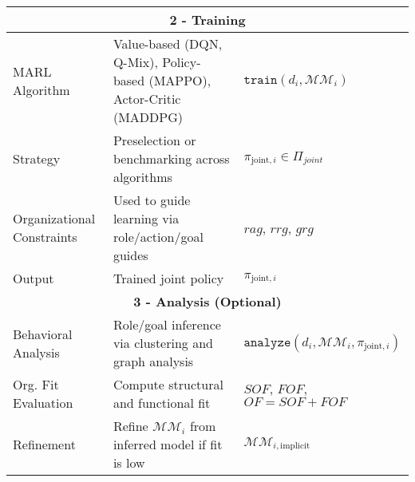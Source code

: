 \begin{table}[h!]
\begin{footnotesize}
\begin{tabular}{|p{2cm}|p{6cm}|p{3cm}|}
            \multicolumn{3}{|c|}{\textbf{2 - Training}}                                                                                                                                                                                                                                    \\ \hline
            MARL Algorithm                & Value-based (DQN, Q-Mix), Policy-based (MAPPO), Actor-Critic (MADDPG)          & $\texttt{train}(d_i, \mathcal{MM}_i)$                                                                                                                         \\ \hline
            Strategy                      & Preselection or benchmarking across algorithms                                 & $\pi_{\text{joint}, i} \in \Pi_{joint}$                                                                                                                       \\ \hline
            Organizational Constraints    & Used to guide learning via role/action/goal guides                             & $rag$, $rrg$, $grg$                                                                                                                                           \\ \hline
            Output                        & Trained joint policy                                                           & $\pi_{\text{joint}, i}$                                                                                                                                       \\ \hline

            \multicolumn{3}{|c|}{\textbf{3 - Analysis (Optional)}}                                                                                                                                                                                                                         \\ \hline
            Behavioral Analysis           & Role/goal inference via clustering and graph analysis                          & $\texttt{analyze}(d_i, \mathcal{MM}_i, \pi_{\text{joint}, i})$                                                                                                \\ \hline
            Org. Fit Evaluation           & Compute structural and functional fit                                          & $SOF$, $FOF$, $OF = SOF + FOF$                                                                                                                                \\ \hline
            Refinement                    & Refine $\mathcal{MM}_i$ from inferred model if fit is low                      & $\mathcal{MM}_{i, \text{implicit}}$                                                                                                                           \\ \hline


\end{tabular}
\end{footnotesize}
\end{table}
